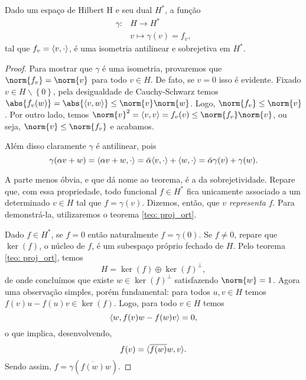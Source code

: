 \begin{teo}
    Dado um espaço de Hilbert H e seu dual \( H^{ * } \), a função
    \begin{align*}
        \gamma : &H \to H^{ * } \\
            &v \mapsto \gamma(v) = f_{ v }
    ,\end{align*}
    tal que \( f_{ v } = \langle v,\cdot\rangle \), é uma isometria antilinear e sobrejetiva em \( H^{ * } \).
\end{teo}
\begin{proof}
    Para mostrar que \( \gamma \) é uma isometria, provaremos que \( \norm{ f_{ v } } = \norm{ v } \) para todo \( v \in H \).
    De fato, se \( v = 0 \) isso é evidente.
    Fixado \( v \in H \backslash \left\{ 0 \right\} \), pela desigualdade de Cauchy-Schwarz temos \( \abs{ f_{ v }(w) } = \abs{ \dotprod{v,w} } \leq \norm{ v } \norm{ w } \).
    Logo, \( \norm{ f_{ v } } \leq \norm{ v } \).
    Por outro lado, temos \( \norm{ v }^2 = \dotprod{v,v} = f_{ v }(v) \leq \norm{ f_{ v } } \norm{ v } \), ou seja, \( \norm{ v } \leq \norm{ f_{ v } } \) e acabamos.

    Além disso claramente \( \gamma \) é antilinear, pois \[
        \gamma (\alpha v + w) = \langle\alpha v + w, \cdot\rangle = \bar{\alpha} \langle v, \cdot\rangle + \langle w,\cdot\rangle = \bar{\alpha} \gamma(v) + \gamma(w)
    .\]

    A parte menos óbvia, e que dá nome ao teorema, é a da sobrejetividade.
    Repare que, com essa propriedade, todo funcional \( f \in H^{ * } \) fica unicamente associado a um determinado \( v \in H \) tal que \( f = \gamma(v) \).
    Dizemos, então, que \( v \) \emph{representa} \( f \).
    Para demonstrá-la, utilizaremos o teorema \ref{teo: proj_ort}.

    Dado \( f \in H^{ * } \), se \( f = 0 \) então naturalmente \( f = \gamma(0) \).
    Se \( f \neq 0 \), repare que \( \ker(f) \), o núcleo de \( f \), é um subespaço próprio fechado de \( H \).
    Pelo teorema \ref{teo: proj_ort}, temos \[
        H = \ker(f) \oplus \ker(f)^{ \perp }
    ,\]
    de onde concluímos que existe \( w \in \ker(f)^{ \perp } \) satisfazendo \( \norm{ w } = 1 \).
    Agora uma observação simples, porém fundamental: para todos \( u, v \in H \) temos \( f(v)u - f(u)v \in \ker(f) \).
    Logo, para todo \( v \in H \) temos \[
        \langle w,f(v)w - f(w)v\rangle = 0
    ,\]
    o que implica, desenvolvendo, \[
        f(v) = \langle\overline{f(w)}w,v\rangle
    .\]
    Sendo assim, \( f = \gamma(\overline{f(w)}w) \).
\end{proof}
